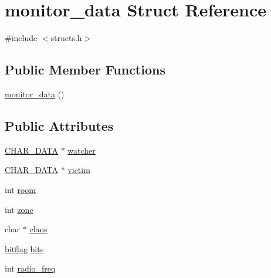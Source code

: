 \hypertarget{structmonitor__data}{\section{monitor\-\_\-data Struct Reference}
\label{structmonitor__data}
}


{\ttfamily \#include $<$structs.\-h$>$}

\subsection*{Public Member Functions}
\begin{DoxyCompactItemize}
\item 
\hyperlink{structmonitor__data_a05f3da76cce63e016df269c359e1eb0f}{monitor\-\_\-data} ()
\end{DoxyCompactItemize}
\subsection*{Public Attributes}
\begin{DoxyCompactItemize}
\item 
\hyperlink{structs_8h_af33ed1e66e8541a08bed257124f50f31}{C\-H\-A\-R\-\_\-\-D\-A\-T\-A} $\ast$ \hyperlink{structmonitor__data_acee0bcdec1d76169428fb2c9969df392}{watcher}
\item 
\hyperlink{structs_8h_af33ed1e66e8541a08bed257124f50f31}{C\-H\-A\-R\-\_\-\-D\-A\-T\-A} $\ast$ \hyperlink{structmonitor__data_a7f3c3cbd9ec994d88d2ef6cc2cf87966}{victim}
\item 
int \hyperlink{structmonitor__data_a02cef827d5a5d9f5f19d57dd1b758c40}{room}
\item 
int \hyperlink{structmonitor__data_aead6e5b82198d45c89c0ca33b4f4470b}{zone}
\item 
char $\ast$ \hyperlink{structmonitor__data_a25333cb59bdd5b479dc0a1453a2731e4}{clans}
\item 
\hyperlink{structs_8h_af5b34f10bae6d3b8f168d5eb6fab2925}{bitflag} \hyperlink{structmonitor__data_a3ec9b1079db7db15fbf7b1951c821d71}{bits}
\item 
int \hyperlink{structmonitor__data_ae2e00742ec116637315a806ed859a3f1}{radio\-\_\-freq}
\end{DoxyCompactItemize}


